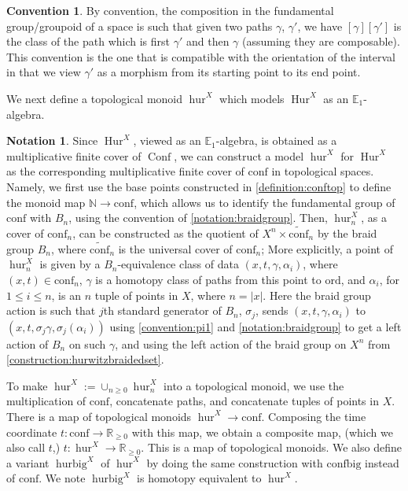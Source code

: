 \documentclass[12 pt]{amsart}
\theoremstyle{plain}
\theoremstyle{definition}
\newtheorem{convention}[theorem]{Convention}
\newtheorem{notation}[theorem]{Notation}
\theoremstyle{remark}
\numberwithin{equation}{section}
\DeclareMathOperator\Hur{Hur}
\DeclareMathOperator\Conf{Conf}
\newcommand\NN{\mathbb{N}}
\newcommand\EE{\mathbb{E}}
\begin{document}
\begin{convention}\label{convention:pi1}
	 By convention, the composition in the fundamental group/groupoid of a space is such that given two paths $\gamma$, $\gamma'$, we have $[\gamma][\gamma']$ is the class of the path which is first $\gamma'$ and then $\gamma$ (assuming they are composable). This convention is the one that is compatible with the orientation of the interval in that we view $\gamma'$ as a morphism from its starting point to its end point.
\end{convention}

We next define a topological monoid $\operatorname{hur}^{X}$ which models $\Hur^{X}$ as an $\EE_1$-algebra.
\begin{notation}\label{definition:hurtop}
	Since $\Hur^{X}$, viewed as an $\EE_1$-algebra, %
	is obtained as a multiplicative 
	finite cover of $\Conf$, we can
	construct a model
	$\operatorname{hur}^{X}$ for $\Hur^{X}$
	as the corresponding multiplicative finite cover of $\mathrm{conf}$ in
	topological spaces. Namely, we first use the base points 
	constructed in \autoref{definition:conftop}
	to define the monoid
	map $\NN \to \mathrm{conf}$, which allows us to identify
	the fundamental group of $\mathrm{conf}$ with $B_n$, using the
	convention of \autoref{notation:braidgroup}. Then,
	$\operatorname{hur}^X_n$, as a cover of $\mathrm{conf}_n$, can be constructed as
	the quotient of $X^n\times \widetilde{\mathrm{conf}}_n$ by the braid
	group $B_n$, where $\widetilde{\mathrm{conf}}_n$ is the universal cover
	of $\mathrm{conf}_n$;
	More explicitly, a point of
$\operatorname{hur}^X_n$
	is given by a $B_n$-equivalence class of data $(x,t,\gamma,\alpha_i)$, where
	$(x,t) \in \mathrm{conf}_n$, $\gamma$ is a homotopy class of paths from this
	point to $\mathrm{ord}$, and $\alpha_i$, for $1 \leq i \leq n$, is an
	$n$ tuple of points in $X$, where $n=|x|$. Here the braid group action
	is such that $j$th standard generator of $B_n$, $\sigma_j$, sends $(x,t,\gamma,\alpha_i)$ to $(x,t,\sigma_j\gamma,\sigma_j(\alpha_i))$ using \autoref{convention:pi1} and \autoref{notation:braidgroup} to get a left action of $B_n$ on such $\gamma$, and using the left action of the braid group on $X^n$ from \autoref{construction:hurwitzbraidedset}.
	
	To make $\operatorname{hur}^{X}:=\cup_{n\geq0}\operatorname{hur}^{X}_n$
	into a topological monoid, we use the multiplication of $\mathrm{conf}$, concatenate paths, and concatenate tuples of points in $X$.
	There is a map of topological monoids $\operatorname{hur}^{X} \to
	\mathrm{conf}$. Composing the time coordinate $t:
	\mathrm{conf}\to \mathbb R_{\geq 0}$ with this map, we obtain a
	composite
	map, (which we also call $t$,) $t:
	\operatorname{hur}^{X} \to \mathbb R_{\geq 0}$. This is a map of
	topological monoids. We also define a variant
	$\operatorname{hurbig}^{X}$ of $\operatorname{hur}^X$ by doing the same construction with $\mathrm{confbig}$ instead of $\mathrm{conf}$. 
	We note 
$\operatorname{hurbig}^{X}$
	is homotopy equivalent to $\operatorname{hur}^X$.
\end{notation}
\end{document}
